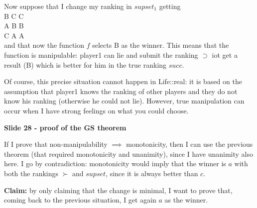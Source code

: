 \documentclass[pt11,a4paper,twoside,reqno,openright]{paper}
\begin{document}
\noindent Now suppose that I change my ranking in $supset_1$ getting\\ 
B \hspace{.6cm} C \hspace{.6cm} C\\
A \hspace{.6cm} B \hspace{.6cm} B\\
C \hspace{.6cm} A \hspace{.6cm} A\\
and that now the function $f$ selects B as the winner. This means that the 
function is manipulable: player1 can lie and submit the ranking $\supset$ iot 
get a result (B) which is better for him in the true ranking $succ$.

\noindent Of course, this precise situation cannot happen in Life::real: it is 
based on the assumption that player1 knows the ranking of other players and 
they do not know his ranking (otherwise he could not lie). However, true 
manipulation can occur when I have strong feelings on what you could choose.

\bigskip
\noindent \textbf{Slide 28 - proof of the GS theorem}

\noindent If I prove that non-manipulability $\implies$ monotonicity, then I can 
use the previous theorem (that required monotonicity and unanimity), since 
I have unanimity also here. I go by contradiction: monotonicity would imply 
that the winner is $a$ with both the rankings $\succ$ and $supset$, since it is 
always better than $c$.


\noindent \textbf{Claim:} by only claiming that the change is minimal, I want 
to prove that, coming back to the previous situation, I get again $a$ as the 
winner.
\end{document}
